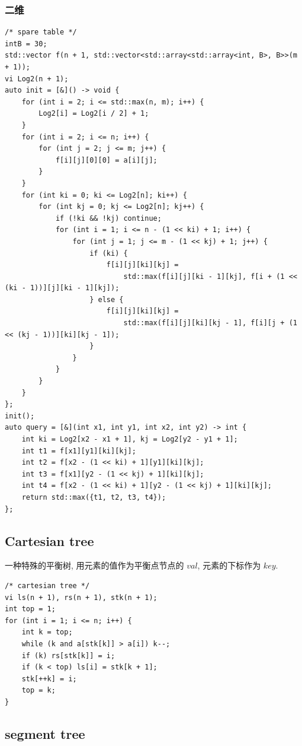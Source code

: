 \documentclass[UTF8, a4paper, titlepage, twoside]{ctexart}
\begin{document}
\subsubsection*{ 二维 }
\begin{lstlisting}[style=cpp]
/* spare table */
intB = 30;
std::vector f(n + 1, std::vector<std::array<std::array<int, B>, B>>(m + 1));
vi Log2(n + 1);
auto init = [&]() -> void {
    for (int i = 2; i <= std::max(n, m); i++) {
        Log2[i] = Log2[i / 2] + 1;
    }
    for (int i = 2; i <= n; i++) {
        for (int j = 2; j <= m; j++) {
            f[i][j][0][0] = a[i][j];
        }
    }
    for (int ki = 0; ki <= Log2[n]; ki++) {
        for (int kj = 0; kj <= Log2[n]; kj++) {
            if (!ki && !kj) continue;
            for (int i = 1; i <= n - (1 << ki) + 1; i++) {
                for (int j = 1; j <= m - (1 << kj) + 1; j++) {
                    if (ki) {
                        f[i][j][ki][kj] =
                            std::max(f[i][j][ki - 1][kj], f[i + (1 << (ki - 1))][j][ki - 1][kj]);
                    } else {
                        f[i][j][ki][kj] =
                            std::max(f[i][j][ki][kj - 1], f[i][j + (1 << (kj - 1))][ki][kj - 1]);
                    }
                }
            }
        }
    }
};
init();
auto query = [&](int x1, int y1, int x2, int y2) -> int {
    int ki = Log2[x2 - x1 + 1], kj = Log2[y2 - y1 + 1];
    int t1 = f[x1][y1][ki][kj];
    int t2 = f[x2 - (1 << ki) + 1][y1][ki][kj];
    int t3 = f[x1][y2 - (1 << kj) + 1][ki][kj];
    int t4 = f[x2 - (1 << ki) + 1][y2 - (1 << kj) + 1][ki][kj];
    return std::max({t1, t2, t3, t4});
};
\end{lstlisting}

\subsection{ Cartesian tree }
一种特殊的平衡树, 用元素的值作为平衡点节点的 $val$, 元素的下标作为 $key$.

\begin{lstlisting}[style=cpp]
/* cartesian tree */
vi ls(n + 1), rs(n + 1), stk(n + 1);
int top = 1;
for (int i = 1; i <= n; i++) {
    int k = top;
    while (k and a[stk[k]] > a[i]) k--;
    if (k) rs[stk[k]] = i;
    if (k < top) ls[i] = stk[k + 1];
    stk[++k] = i;
    top = k;
}
\end{lstlisting}

\subsection{ segment tree }
\end{document}
